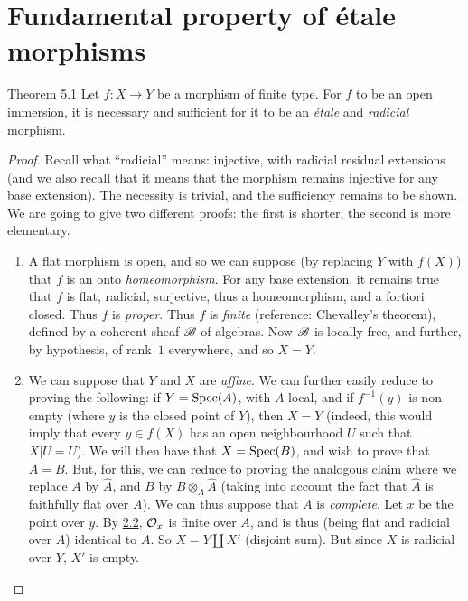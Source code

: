 \section{Fundamental property of étale morphisms}
\label{I.5}

\begin{itenv}{Theorem 5.1}
\label{I.5.1}
  Let $f\colon X\to Y$ be a morphism of finite type.
  For $f$ to be an open immersion, it is necessary and sufficient for it to be an \emph{étale} and \emph{radicial} morphism.
\end{itenv}

\begin{proof}
  Recall what ``radicial'' means: injective, with radicial residual extensions (and we also recall that it means that the morphism remains injective for any base extension).
  The necessity is trivial, and the sufficiency remains to be shown.
  We are going to give two different proofs: the first is shorter, the second is more elementary.
  \begin{enumerate}[(1)]
    \item A flat morphism is open, and so we can suppose (by replacing $Y$ with $f(X)$) that $f$ is an onto \emph{homeomorphism}.
      For any base extension, it remains true that $f$ is flat, radicial, surjective, thus a homeomorphism, and a fortiori closed.
      Thus $f$ is \emph{proper}.
      Thus $f$ is \emph{finite} (reference: Chevalley's theorem), defined by a coherent sheaf $\scr{B}$ of algebras.
      Now $\scr{B}$ is locally free, and further, by hypothesis, of rank~$1$ everywhere, and so $X=Y$.
    \item We can suppose that $Y$ and $X$ are \emph{affine}.
      We can further easily reduce to proving the following:
      if $Y=\Spec(A)$, with $A$ local, and if $f^{-1}(y)$ is non-empty (where $y$ is the closed point of $Y$), then $X=Y$ (indeed, this would imply that every $y\in f(X)$ has an open neighbourhood $U$ such that $X|U=U$).
      We will then have that $X=\Spec(B)$, and wish to prove that $A=B$.
      But, for this, we can reduce to proving the analogous claim where we replace $A$ by $\hat{A}$, and $B$ by $B\otimes_A\hat{A}$
      (taking into account the fact that $\hat{A}$ is faithfully flat over $A$).
      We can thus suppose that $A$ is \emph{complete}.
      Let $x$ be the point over $y$.
      By \hyperref[I.2.2]{2.2}, $\cal{O}_x$ is finite over $A$, and is thus (being flat and radicial over $A$) identical to $A$.
      So $X=Y\coprod X'$ (disjoint sum).
      But since $X$ is radicial over $Y$, $X'$ is empty.
  \end{enumerate}
\end{proof}

